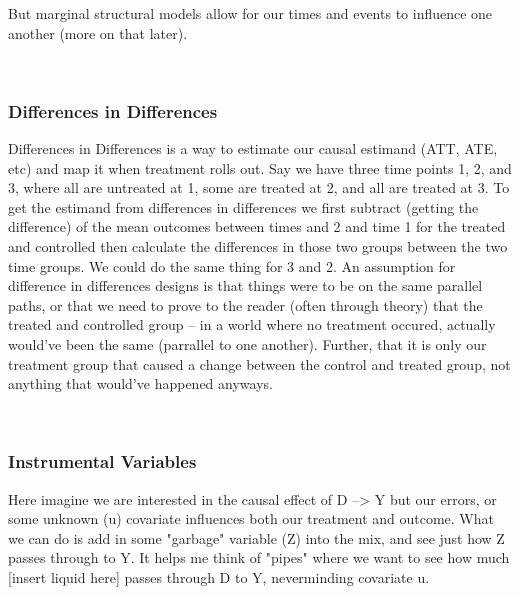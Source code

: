 \documentclass[12pt]{article}\usepackage[]{graphicx}\usepackage[]{color}
\begin{document}
\begin{flushleft}
\noindent But marginal structural models allow for our times and events to influence one another (more on that later).


\hfill \\

\subsubsection{Differences in Differences}
Differences in Differences is a way to estimate our causal estimand (ATT, ATE, etc) and map it when treatment rolls out. Say we have three time points 1, 2, and 3, where all are untreated at 1, some are treated at 2, and all are treated at 3. To get the estimand from differences in differences we first subtract (getting the difference) of the mean outcomes between times and 2 and time 1 for the treated and controlled then calculate the differences in those two groups between the two time groups. We could do the same thing for 3 and 2. An assumption for difference in differences designs is that things were to be on the same parallel paths, or that we need to prove to the reader (often through theory) that the treated and controlled group -- in a world where no treatment occured, actually would've been the same (parrallel to one another). Further, that it is only our treatment group that caused a change between the control and treated group, not anything that would've happened anyways.

\hfill \\

\subsubsection{Instrumental Variables}

Here imagine we are interested in the causal effect of D --> Y but our errors, or some unknown (u) covariate influences both our treatment and outcome. What we can do is add in some "garbage" variable (Z) into the mix, and see just how Z passes through to Y. It helps me think of "pipes" where we want to see how much [insert liquid here] passes through D to Y, neverminding covariate u.

\begin{center}
\end{center}
\hfill




\end{flushleft}
\end{document}
